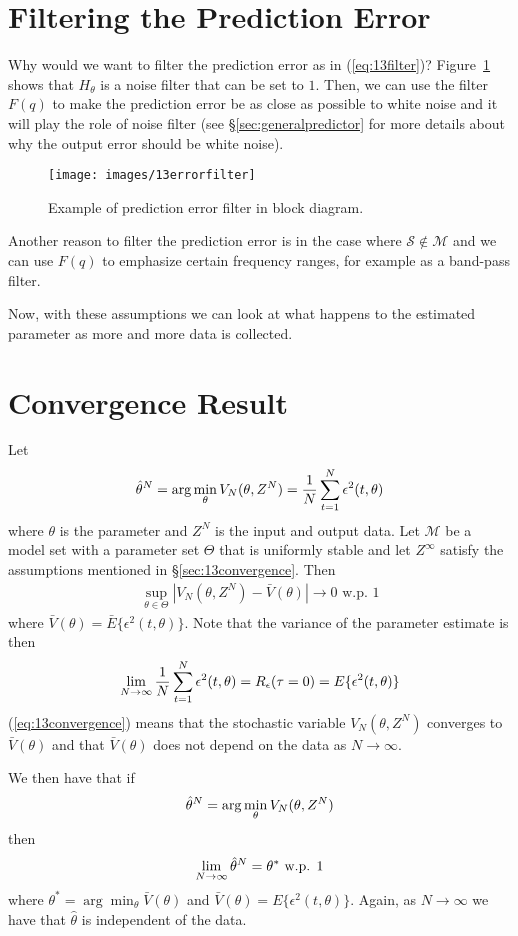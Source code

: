 \section{Filtering the Prediction Error}
Why would we want to filter the prediction error as in (\ref{eq:13filter})? Figure~\ref{fig:13errorfilter} shows that $H_\theta$ is a noise filter that can be set to $1$.
Then, we can use the filter $F(q)$ to make the prediction error be as close as possible to white noise and it will play the role of noise filter (see \S\ref{sec:generalpredictor} for more details about why the output error should be white noise).

\begin{figure}[ht!]
\centering
\texttt{[image: images/13errorfilter]}
\caption{Example of prediction error filter in block diagram.}
\label{fig:13errorfilter}
\end{figure}

Another reason to filter the prediction error is in the case where $\mathcal{S}\notin\mathcal{M}$ and we can use $F(q)$ to emphasize certain frequency ranges, for example as a band-pass filter.

Now, with these assumptions we can look at what happens to the estimated parameter as more and more data is collected.

\section{Convergence Result}
\label{sec:convergence}
Let
$$\hat{\theta}^N = \arg\min_\theta V_N(\theta,Z^N) = \frac{1}{N}\sum_{t=1}^N\epsilon^2(t,\theta)$$
where $\theta$ is the parameter and $Z^N$ is the input and output data.
Let $\mathcal{M}$ be a model set with a parameter set $\Theta$ that is uniformly stable and let $Z^\infty$ satisfy the assumptions mentioned in \S\ref{sec:13convergence}.
Then
\begin{align}
\label{eq:13convergence}
\sup_{\theta\in\Theta}\left|V_N(\theta,Z^N)-\bar{V}(\theta)\right| \to 0 \text{~w.p.~} 1
\end{align}
where $\bar{V}(\theta)=\bar{E}\{\epsilon^2(t,\theta)\}$.
Note that the variance of the parameter estimate is then
$$\lim_{N\to\infty}\frac{1}{N}\sum_{t=1}^N\epsilon^2(t,\theta) = R_\epsilon(\tau=0) = E\{\epsilon^2(t,\theta)\}$$
(\ref{eq:13convergence}) means that the stochastic variable $V_N(\theta,Z^N)$ converges to $\bar{V}(\theta)$ and that $\bar{V}(\theta)$ does not depend on the data as $N\to\infty$.

We then have that if
$$\hat{\theta}^N = \arg\min_\theta V_N(\theta,Z^N)$$
then
$$\lim_{N\to\infty}\hat{\theta}^N = \theta^\ast \text{ w.p. } 1$$
where $\theta^\ast = \arg\min_\theta \bar{V}(\theta)$ and $\bar{V}(\theta) = E\{\epsilon^2(t,\theta)\}$.
Again, as $N\to\infty$ we have that $\hat{\theta}$ is independent of the data.

